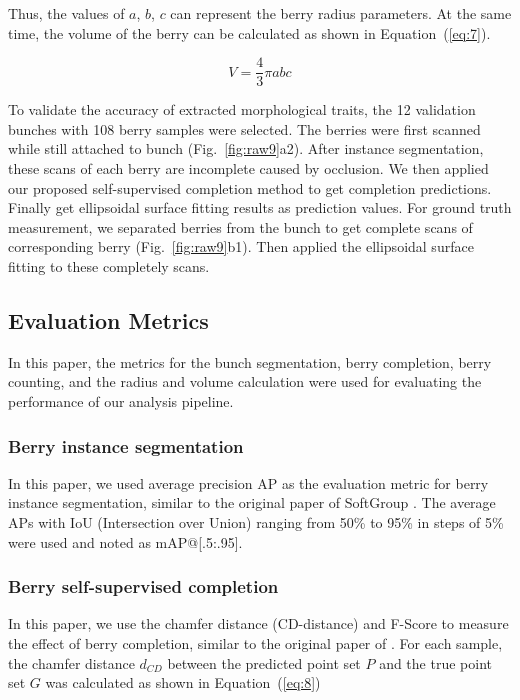 \documentclass[12pt]{article}
\begin{document}
Thus, the values of $a$, $b$, $c$ can represent the berry radius parameters. 
At the same time, the volume of the berry can be calculated as shown in Equation~(\ref{eq:7}).

\begin{equation}
    V=\frac{4}{3} \pi a b c
    \label{eq:7}
\end{equation}

To validate the accuracy of extracted morphological traits, the 12 validation bunches with 108 berry samples were selected. The berries were first scanned while still attached to bunch (Fig.~\ref{fig:raw9}a2). After instance segmentation, these scans of each berry are incomplete caused by occlusion. We then applied our proposed self-supervised completion method to get completion predictions. Finally get ellipsoidal surface fitting results as prediction values. 
For ground truth measurement, we separated berries from the bunch to get complete scans of corresponding berry (Fig.~\ref{fig:raw9}b1). Then applied the ellipsoidal surface fitting to these completely scans. 

\subsection{Evaluation Metrics}

In this paper, the metrics for the bunch segmentation, berry completion, berry counting, and the radius and volume calculation were used for evaluating the performance of our analysis pipeline.

\subsubsection{Berry instance segmentation}
\label{sec:251}
In this paper, we used average precision AP as the evaluation metric for berry instance segmentation, similar to the original paper of SoftGroup \citep{vu_softgroup_2022}. The average APs with IoU (Intersection over Union) ranging from 50\% to 95\% in steps of 5\% were used and noted as mAP@[.5:.95].

\subsubsection{Berry self-supervised completion}

In this paper, we use the chamfer distance (CD-distance) and F-Score to measure the effect of berry completion,  similar to the original paper of \citet{yu_pointr_2021}. 
For each sample, the chamfer distance $d_{CD}$ between the predicted point set $P$ and the true point set $G$ was calculated as shown in Equation~(\ref{eq:8})
\end{document}
